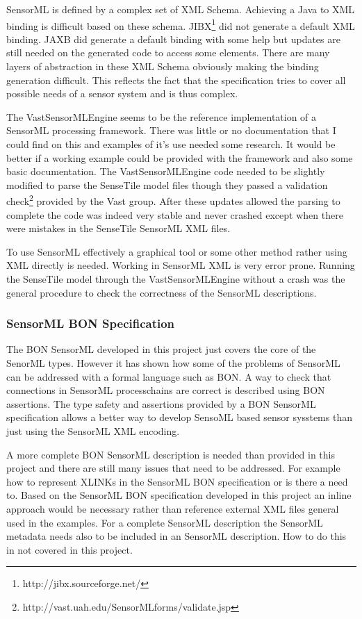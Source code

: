 \documentclass[]{final_report}
\begin{document}
SensorML is defined by a complex set of XML Schema. Achieving a Java to XML binding is difficult based on these schema. JIBX\footnote{http://jibx.sourceforge.net/} did not generate a default XML binding. JAXB did generate a default binding with some help but updates are still needed on the generated code to access some elements. There are many layers of abstraction in these XML Schema obviously making the binding generation difficult. This reflects the fact that the specification tries to cover all possible needs of a sensor system and is thus complex. 

The VastSensorMLEngine seems to be the reference implementation of a SensorML processing framework. There was little or no documentation that I could find on this and examples of it's use needed some research. It would be better if a working example could be provided with the framework and also some basic documentation. The VastSensorMLEngine code needed to be slightly modified to parse the SenseTile model files though they passed a validation check\footnote{http://vast.uah.edu/SensorMLforms/validate.jsp} provided by the Vast group. After these updates allowed the parsing to complete the code was indeed very stable and never crashed except when there were mistakes in the SenseTile SensorML XML files.

To use SensorML effectively a graphical tool or some other method rather using XML directly is needed. Working in SensorML XML is very error prone. Running the SenseTile model through the VastSensorMLEngine without a crash was the general procedure to check the correctness of the SensorML descriptions. 

\subsubsection{SensorML BON Specification}
The BON SensorML developed in this project just covers the core of the SenorML types. However it has shown how some of the problems of SensorML can be addressed with a formal language such as BON. A way to check that connections in SensorML processchains are correct is described using BON assertions. The type safety and assertions provided by a BON SensorML specification allows a better way to develop SensoML based sensor sysstems than just using the SensorML XML encoding.

A more complete BON SensorML description is needed than provided in this project and there are still many issues that need to be addressed. For example how to represent XLINKs in the SensorML BON specification or is there a need to. Based on the SensorML BON specification developed in this project an inline approach would be necessary rather than reference external XML files general used in the examples. For a complete SensorML description the SensorML metadata needs also to be included in an SensorML description. How to do this in not covered in this project. 
\end{document}
